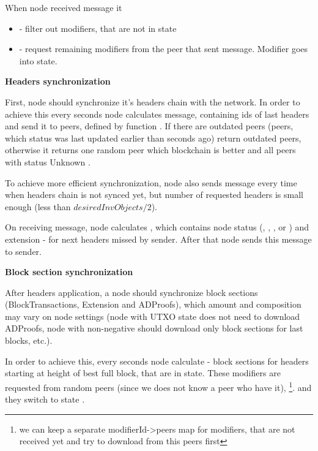 When node received  message it
\begin{itemize}
    \item - filter out modifiers, that are not in state 
    \item - request remaining modifiers from the peer that sent  message.
    Modifier goes into  state.
\end{itemize}

\textbf{Headers synchronization}

First, node should synchronize it's headers chain with the network.
In order to achieve this every  seconds node calculates  message,
containing ids of last  headers and send it to peers,
defined by function .
If there are outdated peers (peers, which status
was last updated earlier than  seconds ago)  return outdated peers,
otherwise it returns one random peer which blockchain is better and all peers with status Unknown
.

To achieve more efficient synchronization, node also sends  message every time when headers chain is
not synced yet, but number of requested headers is small enough (less than $desiredInvObjects / 2$).

On receiving  message, node calculates ,
which contains node status (, , ,  or ) and extension -
 for next  headers missed by  sender.
After that node sends this  message to  sender.

\textbf{Block section synchronization}

After headers application, a node should synchronize block sections
(BlockTransactions, Extension and ADProofs), which amount and composition
may vary on node settings (node with UTXO state does not need to download ADProofs,
node with non-negative 
should download only block sections for last  blocks, etc.).

In order to achieve this, every  seconds node calculate  -
block sections for headers starting at height of best full block, that are in  state.
These modifiers are requested from random peers (since we does not know a peer who have it),
\footnote{we can keep a separate modifierId->peers map for modifiers, that are not received yet and try to download from this peers first}.
and they switch to state .

